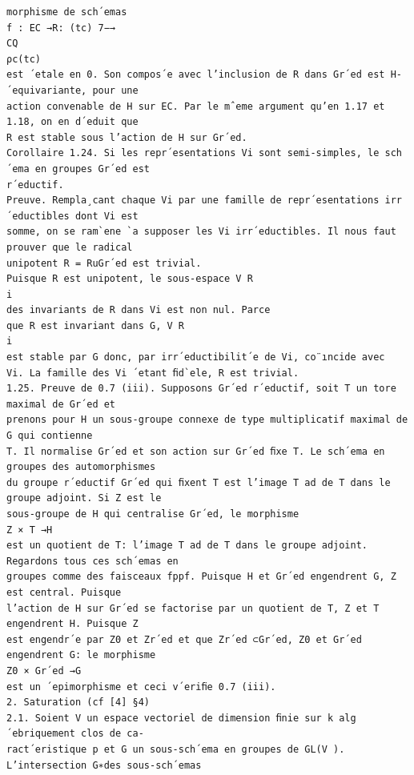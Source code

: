 \documentclass[10pt]{article}
\begin{document}
\begin{verbatim}
morphisme de sch´emas
f : EC →R: (tc) 7−→
CQ
ρc(tc)
est ´etale en 0. Son compos´e avec l’inclusion de R dans Gr´ed est H-´equivariante, pour une
action convenable de H sur EC. Par le mˆeme argument qu’en 1.17 et 1.18, on en d´eduit que
R est stable sous l’action de H sur Gr´ed.
Corollaire 1.24. Si les repr´esentations Vi sont semi-simples, le sch´ema en groupes Gr´ed est
r´eductif.
Preuve. Rempla¸cant chaque Vi par une famille de repr´esentations irr´eductibles dont Vi est
somme, on se ram`ene `a supposer les Vi irr´eductibles. Il nous faut prouver que le radical
unipotent R = RuGr´ed est trivial.
Puisque R est unipotent, le sous-espace V R
i
des invariants de R dans Vi est non nul. Parce
que R est invariant dans G, V R
i
est stable par G donc, par irr´eductibilit´e de Vi, co¨ıncide avec
Vi. La famille des Vi ´etant ﬁd`ele, R est trivial.
1.25. Preuve de 0.7 (iii). Supposons Gr´ed r´eductif, soit T un tore maximal de Gr´ed et
prenons pour H un sous-groupe connexe de type multiplicatif maximal de G qui contienne
T. Il normalise Gr´ed et son action sur Gr´ed ﬁxe T. Le sch´ema en groupes des automorphismes
du groupe r´eductif Gr´ed qui ﬁxent T est l’image T ad de T dans le groupe adjoint. Si Z est le
sous-groupe de H qui centralise Gr´ed, le morphisme
Z × T →H
est un quotient de T: l’image T ad de T dans le groupe adjoint. Regardons tous ces sch´emas en
groupes comme des faisceaux fppf. Puisque H et Gr´ed engendrent G, Z est central. Puisque
l’action de H sur Gr´ed se factorise par un quotient de T, Z et T engendrent H. Puisque Z
est engendr´e par Z0 et Zr´ed et que Zr´ed ⊂Gr´ed, Z0 et Gr´ed engendrent G: le morphisme
Z0 × Gr´ed →G
est un ´epimorphisme et ceci v´eriﬁe 0.7 (iii).
2. Saturation (cf [4] §4)
2.1. Soient V un espace vectoriel de dimension ﬁnie sur k alg´ebriquement clos de ca-
ract´eristique p et G un sous-sch´ema en groupes de GL(V ). L’intersection G∗des sous-sch´emas


\end{verbatim}
\end{document}
